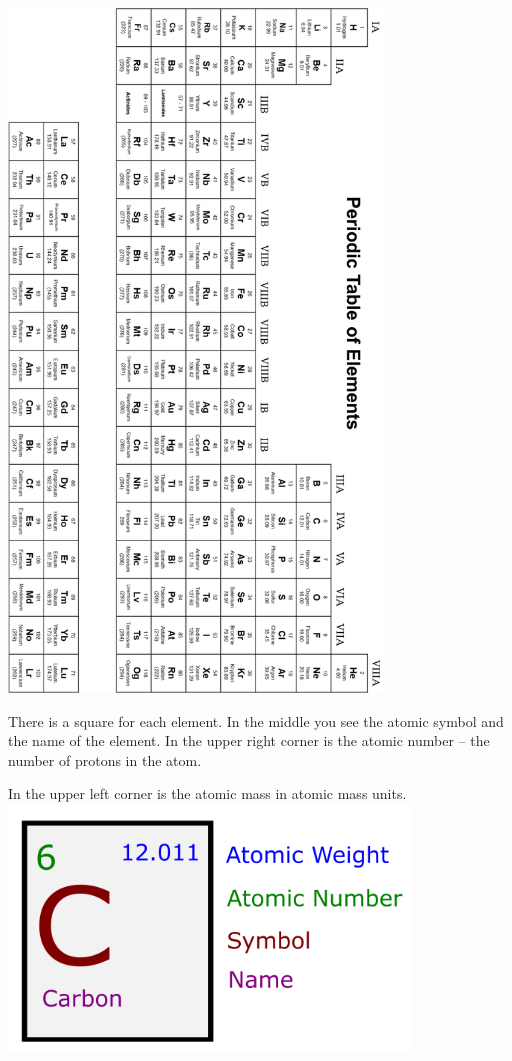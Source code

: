 \includegraphics[width=0.75\textwidth]{periodic.png}

\pagebreak
There is a square for each element. In the middle you see the atomic
symbol and the name of the element. In the upper right corner is the
atomic number -- the number of protons in the atom.

In the upper left corner is the atomic mass in atomic mass units.
\includegraphics[width=0.8\textwidth]{Atomic_Carbon_Diagram.png}

